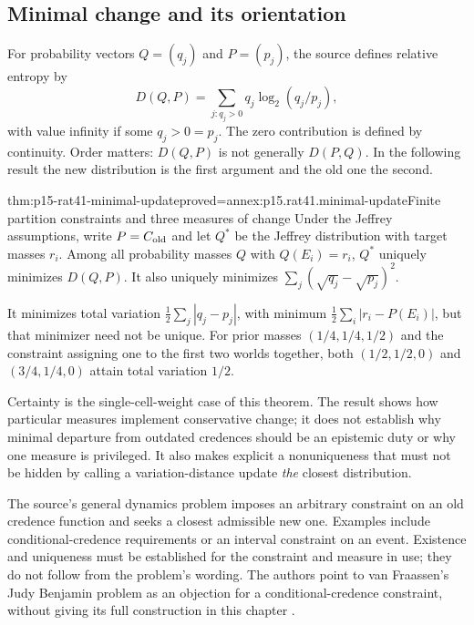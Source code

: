 \subsection{Minimal change and its orientation}

For probability vectors \(Q=(q_j)\) and \(P=(p_j)\), the source defines
relative entropy by
\[
                    D(Q,P)=\sum_{j:q_j>0}q_j\log_2(q_j/p_j),
\]
with value infinity if some \(q_j>0=p_j\). The zero contribution is
defined by continuity. Order matters: \(D(Q,P)\) is not generally
\(D(P,Q)\). In the following result the new distribution is the first
argument and the old one the second.

\begin{hbtheorem}{thm:p15-rat41-minimal-update}{proved=annex:p15.rat41.minimal-update}{Finite partition constraints and three measures of change}
Under the Jeffrey assumptions, write \(P=C_{\rm old}\) and let
\(Q^*\) be the Jeffrey distribution with target masses \(r_i\).
Among all probability masses \(Q\) with \(Q(E_i)=r_i\),
\(Q^*\) uniquely minimizes \(D(Q,P)\). It also uniquely minimizes
\(\sum_j(\sqrt{q_j}-\sqrt{p_j})^2\).

It minimizes total variation \(\frac12\sum_j|q_j-p_j|\), with minimum
\(\frac12\sum_i|r_i-P(E_i)|\), but that minimizer need not be unique.
For prior masses \((1/4,1/4,1/2)\) and the constraint assigning one
to the first two worlds together, both \((1/2,1/2,0)\) and
\((3/4,1/4,0)\) attain total variation \(1/2\).
\end{hbtheorem}

Certainty is the single-cell-weight case of this theorem. The result
shows how particular measures implement conservative change; it does
not establish why minimal departure from outdated credences should be
an epistemic duty or why one measure is privileged. It also makes
explicit a nonuniqueness that must not be hidden by calling a
variation-distance update \emph{the} closest distribution.

The source's general dynamics problem imposes an arbitrary constraint
on an old credence function and seeks a closest admissible new one.
Examples include conditional-credence requirements or an interval
constraint on an event. Existence and uniqueness must be established
for the constraint and measure in use; they do not follow from the
problem's wording. The authors point to van Fraassen's Judy Benjamin
problem as an objection for a conditional-credence constraint, without
giving its full construction in this chapter
\parencite[pp.~244--245]{HajekStaffel2021Dynamics}.

